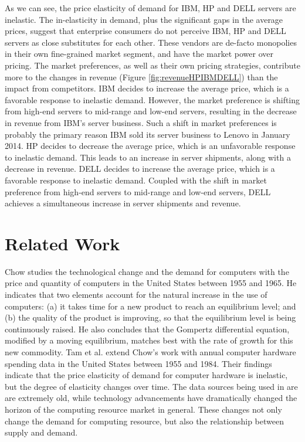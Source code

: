 \documentclass[10pt,journal,cspaper,compsoc]{IEEEtran}
\begin{document}
As we can see, the price elasticity of demand for IBM, HP and DELL servers are inelastic. The in-elasticity in demand, plus the significant gaps in the average prices, suggest that enterprise consumers do not perceive IBM, HP and DELL servers as close substitutes for each other. These vendors are de-facto monopolies in their own fine-grained market segment, and have the market power over pricing. The market preferences, as well as their own pricing strategies, contribute more to the changes in revenue (Figure \ref{fig:revenueHPIBMDELL}) than the impact from competitors. IBM decides to increase the average price, which is a favorable response to inelastic demand. However, the market preference is shifting from high-end servers to mid-range and low-end servers, resulting in the decrease in revenue from IBM's server business. Such a shift in market preferences is probably the primary reason IBM sold its server business to Lenovo in January 2014. HP decides to decrease the average price, which is an unfavorable response to inelastic demand. This leads to an increase in server shipments, along with a decrease in revenue. DELL decides to increase the average price, which is a favorable response to inelastic demand. Coupled with the shift in market preference from high-end servers to mid-range and low-end servers, DELL achieves a simultaneous increase in server shipments and revenue. 

\section{Related Work}
\label{sec:relatedwork}

Chow \cite{chow} studies the technological change and the demand for computers with the price and quantity of computers in the United States between 1955 and 1965. He indicates that two elements account for the natural increase in the use of computers: (a) it takes time for a new product to reach an equilibrium level; and (b) the quality of the product is improving, so that the equilibrium level is being continuously raised. He also concludes that the Gompertz differential equation, modified by a moving equilibrium, matches best with the rate of growth for this new commodity. Tam et al. \cite{tam} extend Chow's work with annual computer hardware spending data in the United States between 1955 and 1984. Their findings indicate that the price elasticity of demand for computer hardware is inelastic, but the degree of elasticity changes over time. The data sources being used in \cite{chow} are \cite{tam} are extremely old, while technology advancements have dramatically changed the horizon of the computing resource market in general. These changes not only change the demand for computing resource, but also the relationship between supply and demand. 
\end{document}
